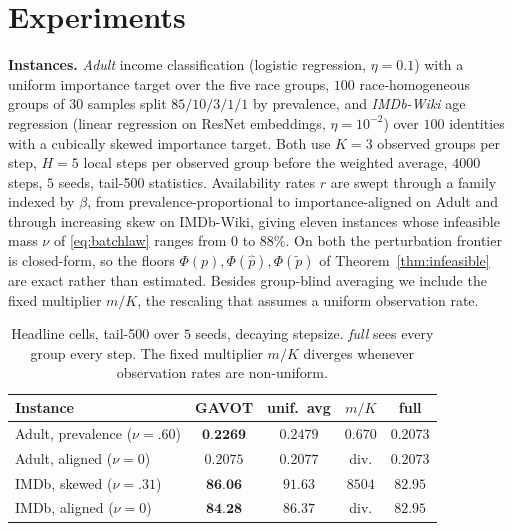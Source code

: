\documentclass{article}
\theoremstyle{definition}
\newcommand{\avot}{\textsf{GAVOT}}
\newcommand{\best}[1]{\textbf{#1}}
\begin{document}
\section{Experiments}
\label{sec:exp}

\noindent\textbf{Instances.}
\emph{Adult} income classification \cite{uci_adult} (logistic regression,
$\eta{=}0.1$) with a uniform importance target over the five race groups, $100$
race-homogeneous groups of $30$ samples split $85/10/3/1/1$ by prevalence, and
\emph{IMDb-Wiki} age regression \cite{rothe2018imdbwiki} (linear regression on
ResNet embeddings, $\eta{=}10^{-2}$) over $100$ identities with a cubically
skewed importance target. Both use $K=3$ observed groups per step,
$H{=}5$ local steps per observed group before the weighted average, $4000$
steps, $5$ seeds, tail-500 statistics. Availability rates $r$ are swept through
a family indexed by $\beta$, from prevalence-proportional to importance-aligned
on Adult and through increasing skew on IMDb-Wiki, giving eleven instances whose
infeasible mass $\nu$ of \eqref{eq:batchlaw} ranges from $0$ to $88\%$. On both
the perturbation frontier is closed-form, so the floors $\Phi(p),\Phi(\hat p),
\Phi(\tilde p)$ of Theorem~\ref{thm:infeasible} are exact rather than estimated.
Besides group-blind averaging we include the fixed multiplier $m/K$, the
rescaling that assumes a uniform observation rate.

\begin{table}[t]
\centering
\caption{Headline cells, tail-500 over $5$ seeds, decaying stepsize. \emph{full}
sees every group every step. The fixed multiplier $m/K$ diverges whenever
observation rates are non-uniform.}
\label{tab:overall}
\setlength{\tabcolsep}{2.4pt}
\begin{tabular}{lcccc}
\toprule
Instance & \avot{} & unif.\ avg & $m/K$ & full \\
\midrule
Adult, prevalence ($\nu{=}.60$) & $\best{0.2269}$ & $0.2479$ & $0.670$ & $0.2073$ \\
Adult, aligned ($\nu{=}0$)      & $0.2075$ & $0.2077$ & div. & $0.2073$ \\
IMDb, skewed ($\nu{=}.31$)      & $\best{86.06}$ & $91.63$ & $8504$ & $82.95$ \\
IMDb, aligned ($\nu{=}0$)       & $\best{84.28}$ & $86.37$ & div. & $82.95$ \\
\bottomrule
\end{tabular}
\end{table}
\end{document}
